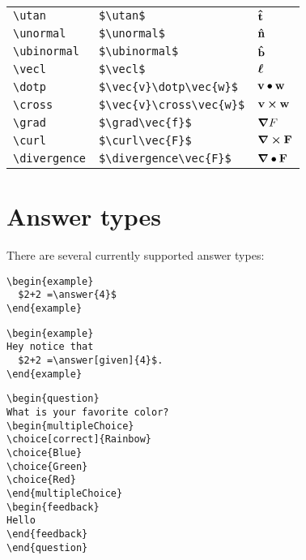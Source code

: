 \documentclass{ximera}
\begin{document}
\begin{tabular*}{1.0\textwidth}{lll}
\verb|\utan| & \verb|$\utan$| & $\mathbf{\hat{t}}$\\
\verb|\unormal| & \verb|$\unormal$| & $\mathbf{\hat{n}}$\\
\verb|\ubinormal| & \verb|$\ubinormal$| & $\mathbf{\hat{b}}$\\
\verb|\vecl| & \verb|$\vecl$| & $\boldsymbol{\ell}$\\
\verb|\dotp| & \verb|$\vec{v}\dotp\vec{w}$| & $\mathbf{v}\bullet\mathbf{w}$\\
\verb|\cross| & \verb|$\vec{v}\cross\vec{w}$| & $\mathbf{v}\boldsymbol\times\mathbf{w}$\\
\verb|\grad| & \verb|$\grad\vec{f}$| & $\boldsymbol\nabla F$\\
\verb|\curl| & \verb|$\curl\vec{F}$| & $\boldsymbol\nabla\boldsymbol\times\mathbf{F}$\\
\verb|\divergence| & \verb|$\divergence\vec{F}$| & $\boldsymbol\nabla\bullet\mathbf{F}$\\
\end{tabular*}

\section{Answer types}

There are several currently supported answer types:

\begin{verbatim}
\begin{example}
  $2+2 =\answer{4}$
\end{example}
\end{verbatim}

\begin{verbatim}
\begin{example}
Hey notice that
  $2+2 =\answer[given]{4}$.
\end{example}
\end{verbatim}

\begin{verbatim}
\begin{question}
What is your favorite color?
\begin{multipleChoice}
\choice[correct]{Rainbow}
\choice{Blue}
\choice{Green}
\choice{Red}
\end{multipleChoice}
\begin{feedback}
Hello
\end{feedback}
\end{question}
\end{verbatim}
\end{document}
